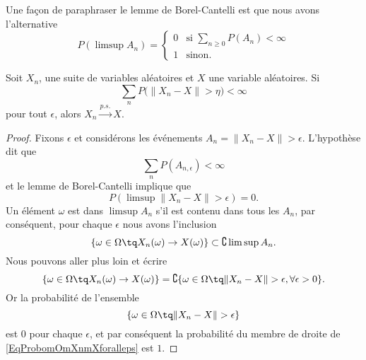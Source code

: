 Une façon de paraphraser le lemme de Borel-Cantelli est que nous avons l'alternative
\begin{equation}    \label{EqparaphrCantelli}
    P(\limsup A_n)=\begin{cases}
        0    &   \text{si $\sum_{n\geq 0}P(A_n)<\infty$}\\
        1    &    \text{sinon}.
    \end{cases}
\end{equation}

\begin{proposition}
    Soit \( X_n\), une suite de variables aléatoires et \( X\) une variable aléatoires. Si
    \begin{equation}
        \sum_nP\big( \| X_n-X \|>\eta \big)<\infty
    \end{equation}
    pour tout \( \epsilon\), alors \( X_n\stackrel{p.s.}{\longrightarrow}X\).
\end{proposition}

\begin{proof}
    Fixons \( \epsilon\) et considérons les événements \( A_{n}=\| X_n-X \|>\epsilon\). L'hypothèse dit que
    \begin{equation}
        \sum_nP(A_{n,\epsilon})<\infty
    \end{equation}
    et le lemme de Borel-Cantelli implique que
    \begin{equation}
        P(\limsup\| X_n-X \|>\epsilon)=0.
    \end{equation}
    Un élément \( \omega\) est dans \( \limsup A_n\) s'il est contenu dans tous les \( A_n\), par conséquent, pour chaque \( \epsilon\) nous avons l'inclusion
    \begin{equation}
        \{ \omega\in\Omega\tq X_n(\omega)\to X(\omega) \}\subset\complement\limsup A_n.
    \end{equation}
    Nous pouvons aller plus loin et écrire
    \begin{equation}        \label{EqProbomOmXnmXforalleps}
        \{ \omega\in\Omega\tq X_n(\omega)\to X(\omega) \}=\complement\{ \omega\in\Omega\tq \| X_n-X \|>\epsilon,\forall\epsilon>0 \}.
    \end{equation}
    Or la probabilité de l'ensemble
    \begin{equation}
        \{ \omega\in\Omega\tq\| X_n-X \|>\epsilon \}
    \end{equation}
    est \( 0\) pour chaque \( \epsilon\), et par conséquent la probabilité du membre de droite de \eqref{EqProbomOmXnmXforalleps} est \( 1\).
\end{proof}

